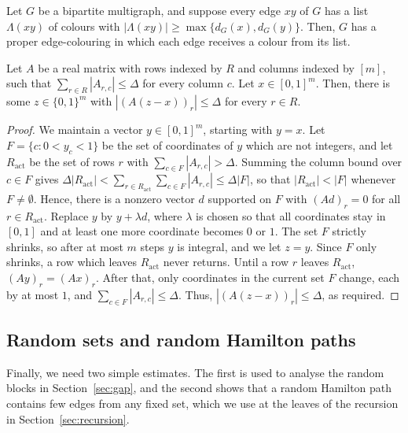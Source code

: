 \begin{lemma}\label{lem:BKW}
Let $G$ be a bipartite multigraph, and suppose every edge $xy$ of $G$ has a list $\Lambda(xy)$ of colours with $|\Lambda(xy)|\ge\max\{d_G(x),d_G(y)\}$. Then, $G$ has a proper edge-colouring in which each edge receives a colour from its list.
\end{lemma}

\begin{lemma}\label{lem:BF}
Let $A$ be a real matrix with rows indexed by $R$ and columns indexed by $[m]$, such that $\sum_{r\in R}|A_{r,c}|\le\Delta$ for every column $c$. Let $x\in[0,1]^m$. Then, there is some $z\in\{0,1\}^m$ with $|(A(z-x))_r|\le\Delta$ for every $r\in R$.
\end{lemma}
\begin{proof}
We maintain a vector $y\in[0,1]^m$, starting with $y=x$. Let $F=\{c:0<y_c<1\}$ be the set of coordinates of $y$ which are not integers, and let $R_{\mathrm{act}}$ be the set of rows $r$ with $\sum_{c\in F}|A_{r,c}|>\Delta$.
Summing the column bound over $c\in F$ gives $\Delta|R_{\mathrm{act}}|<\sum_{r\in R_{\mathrm{act}}}\sum_{c\in F}|A_{r,c}|\le\Delta|F|$, so that $|R_{\mathrm{act}}|<|F|$ whenever $F\ne\emptyset$. Hence, there is a nonzero vector $d$ supported on $F$ with $(Ad)_r=0$ for all $r\in R_{\mathrm{act}}$.
Replace $y$ by $y+\lambda d$, where $\lambda$ is chosen so that all coordinates stay in $[0,1]$ and at least one more coordinate becomes $0$ or $1$. The set $F$ strictly shrinks, so after at most $m$ steps $y$ is integral, and we let $z=y$.
Since $F$ only shrinks, a row which leaves $R_{\mathrm{act}}$ never returns. Until a row $r$ leaves $R_{\mathrm{act}}$, $(Ay)_r=(Ax)_r$. After that, only coordinates in the current set $F$ change, each by at most $1$, and $\sum_{c\in F}|A_{r,c}|\le\Delta$. Thus, $|(A(z-x))_r|\leq \Delta$, as required.
\end{proof}

\subsection{Random sets and random Hamilton paths}\label{sec:randomsets}
Finally, we need two simple estimates. The first is used to analyse the random blocks in Section~\ref{sec:gap}, and the second shows that a random Hamilton path contains few edges from any fixed set, which we use at the leaves of the recursion in Section~\ref{sec:recursion}.

